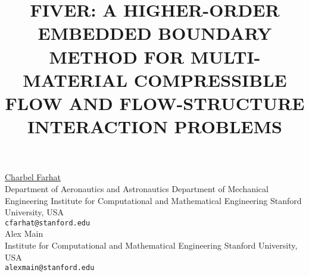 \documentclass[article,A4,11pt]{llncs}%
\begin{document}
\title{FIVER: A HIGHER-ORDER EMBEDDED BOUNDARY METHOD FOR MULTI-MATERIAL COMPRESSIBLE FLOW AND FLOW-STRUCTURE INTERACTION PROBLEMS}
 \author{} \institute{}
\maketitle
\begin{center}
{\large \underline{Charbel Farhat}}\\
Department of Aeronautics and Astronautics Department of Mechanical Engineering Institute for Computational and Mathematical Engineering Stanford University, USA\\
{\tt cfarhat@stanford.edu}
\\ \vspace{4mm}
{\large Alex Main}\\
Institute for Computational and Mathematical Engineering Stanford University, USA\\
{\tt alexmain@stanford.edu}
\end{center}
\end{document}
